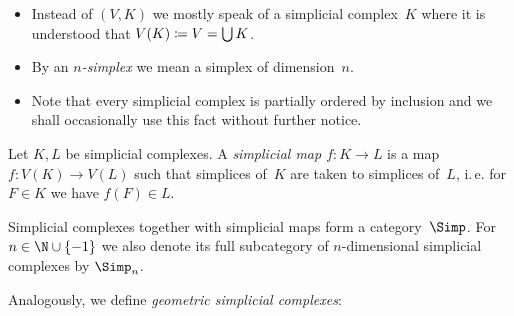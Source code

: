\begin{thConvention}\hfill
    \begin{itemize}
        \item
            Instead of $(V,K)$ we mostly speak of a simplicial complex~$K$ where it
            is understood that $V(K)\coloneqq V = \bigcup K$.
            
        \item
            By an \emph{$n$-simplex} we mean a simplex of dimension~$n$.
            
        \item
            Note that every simplicial complex is partially ordered by
            inclusion and we shall occasionally use this fact without
            further notice.
    \end{itemize}
\end{thConvention}

\begin{thDef}
    Let $K,L$ be simplicial complexes. A \emph{simplicial map $f\colon K\to L$}
    is a map $f\colon V(K)\to V(L)$ such that simplices of~$K$ are taken to
    simplices of~$L$, i.\,e. for $F\in K$ we have $f(F) \in L$.
\end{thDef}

\begin{thDef}
    Simplicial complexes together with simplicial maps form a category~$\Simp$.
    For $n\in\N\cup\{-1\}$ we also denote its full subcategory of
    $n$-dimensional simplicial complexes by $\Simp_n$.
\end{thDef}

Analogously, we define \emph{geometric simplicial complexes}:

